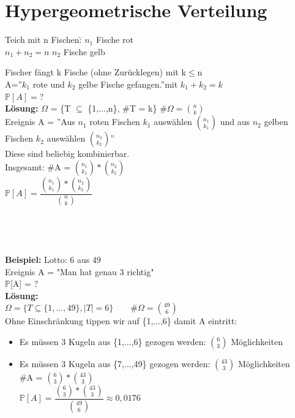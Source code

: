 \section{Hypergeometrische Verteilung}
\begin{tabbing}
	Teich mit n Fischen:\hspace{1cm}\= $n_1$ Fische rot\\
	$n_1 + n_2 = n$ \>$n_2$ Fische gelb
\end{tabbing}
Fischer fängt k Fische (ohne Zurücklegen) mit k$\leq$n\medskip\\
A=''$k_1$ rote und $k_2$ gelbe Fische gefangen.''mit $k_1 + k_2 = k$\medskip\\
$\mathds{P}[A] = ?$\medskip\\
\textbf{Lösung:} $\Omega$ = \{T $\subseteq$ \{1,...,n\}, \#T = k\}\hspace{5mm} \#$\Omega=\binom{n}{k}$\medskip\\
Ereignis A = ''Aus $n_1$ roten Fischen $k_1$ auswählen $\binom{n_1}{k_1}$ und aus $n_2$ gelben Fischen $k_2$ auswählen $\binom{n_2}{k_2}$''\medskip\\
Diese sind beliebig kombinierbar.\medskip\\
Insgesamt: \#A = $\binom{n_1}{k_1}*\binom{n_2}{k_2}$\medskip\\
$\mathds{P}[A] = \dfrac{\binom{n_1}{k_1}*\binom{n_2}{k_2}}{\binom{n}{k}}$
\\\\\\\\\\
\textbf{Beispiel:} Lotto: 6 aus 49\medskip\\
Ereignis A = "Man hat genau 3 richtig"\medskip\\
$\mathds{P}$[A] = ?\medskip\\
\textbf{Lösung:}\\
$\Omega = \{T \subseteq \{1,...,49\},|T| = 6\} \qquad \#\Omega = \binom{49}{6}$\medskip\\
Ohne Einschränkung tippen wir auf \{1,...,6\} damit A eintritt:
\begin{itemize}
	\item Es müssen 3 Kugeln aus \{1,...,6\} gezogen werden: $\binom{6}{3}$ Möglichkeiten
	\item Es müssen 3 Kugeln aus \{7,...,49\} gezogen werden: $\binom{43}{3}$ Möglichkeiten\medskip\\
	\#A = $\binom{6}{3}*\binom{43}{3}$\smallskip\\
	$\mathds{P}[A] = \dfrac{\binom{6}{3}*\binom{43}{3}}{\binom{49}{6}}\approx 0,0176$
\end{itemize}
